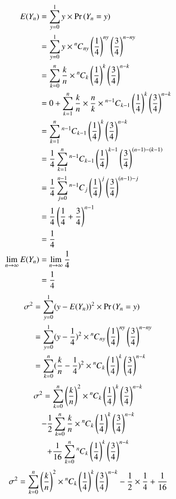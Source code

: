 \documentclass[journal,12pt,twocolumn]{IEEEtran}
\begin{document}
\begin{align}
    E(Y_n) &= \sum_{y=0}^{1}y\times  \Pr{(Y_n = y)}
    \\&= \sum_{y=0}^{1}y\times \comb[n]{ny}\brak{\frac{1}{4}}^{ny} \brak{\frac{3}{4}}^{n-ny}
    \\&= \sum_{k=0}^{n} \frac{k}{n}\times\comb[n]{k}\brak{\frac{1}{4}}^{k} \brak{\frac{3}{4}}^{n-k}
    \\&= 0 + \sum_{k=1}^{n} \frac{k}{n}\times\frac{n}{k}\times\comb[n-1]{k-1}\brak{\frac{1}{4}}^{k} \brak{\frac{3}{4}}^{n-k}
    \\&= \sum_{k=1}^{n} \comb[n-1]{k-1}\brak{\frac{1}{4}}^{k} \brak{\frac{3}{4}}^{n-k}
    \\&= \frac{1}{4} \sum_{k=1}^{n} \comb[n-1]{k-1}\brak{\frac{1}{4}}^{k-1} \brak{\frac{3}{4}}^{(n-1)-(k-1)}
    \\&= \frac{1}{4} \sum_{j=0}^{n-1} \comb[n-1]{j}\brak{\frac{1}{4}}^{j} \brak{\frac{3}{4}}^{(n-1)-j}
    \\&= \frac{1}{4} \brak{\frac{1}{4} + \frac{3}{4}}^{n-1}
    \\&= \frac{1}{4}
    \\\lim_{n\rightarrow \infty} E(Y_n) &= \lim_{n\rightarrow \infty} \frac{1}{4} 
    \\&= \frac{1}{4}
\end{align}
\begin{align}
    \sigma ^{2} &= \sum_{y=0}^{1} (y - E(Y_n))^2 \times \Pr{(Y_n = y)}
    \\&= \sum_{y=0}^{1} (y - \frac{1}{4})^2 \times  \comb[n]{ny}\brak{\frac{1}{4}}^{ny} \brak{\frac{3}{4}}^{n-ny}
    \\&= \sum_{k=0}^{n} (\frac{k}{n}- \frac{1}{4})^2 \times  \comb[n]{k}\brak{\frac{1}{4}}^{k} \brak{\frac{3}{4}}^{n-k}
\end{align}
\begin{multline}
     \sigma ^{2} = \sum_{k=0}^{n} \brak{\frac{k}{n}}^2 \times  \comb[n]{k}\brak{\frac{1}{4}}^{k} \brak{\frac{3}{4}}^{n-k}
     \\ - \frac{1}{2}\sum_{k=0}^{n} \frac{k}{n}\times\comb[n]{k}\brak{\frac{1}{4}}^{k} \brak{\frac{3}{4}}^{n-k}
     \\ + \frac{1}{16} \sum_{k=0}^{n} \comb[n]{k}\brak{\frac{1}{4}}^{k} \brak{\frac{3}{4}}^{n-k}
\end{multline}
\begin{align}
     \sigma ^{2} = \sum_{k=0}^{n} \brak{\frac{k}{n}}^2 \times  \comb[n]{k}\brak{\frac{1}{4}}^{k} \brak{\frac{3}{4}}^{n-k}
      - \frac{1}{2} \times \frac{1}{4} + \frac{1}{16} 
\end{align}
\end{document}

